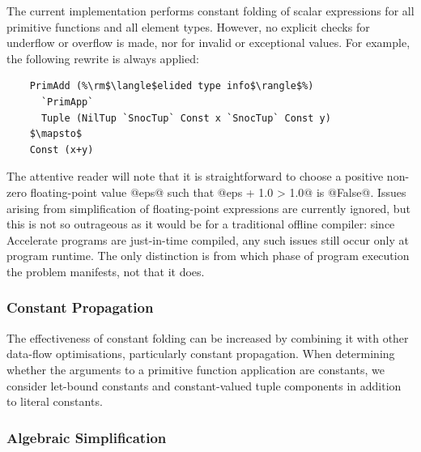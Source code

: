 The current implementation performs constant folding of scalar expressions for
all primitive functions and all element types. However, no explicit checks for
underflow or overflow is made, nor for invalid or exceptional values. For
example, the following rewrite is always applied:
%
%
\begin{lstlisting}[style=Haskell,numbers=none,mathescape]
%\bf$\langle$ constant folding $\rangle$%
    PrimAdd (%\rm$\langle$elided type info$\rangle$%)
      `PrimApp`
      Tuple (NilTup `SnocTup` Const x `SnocTup` Const y)
    $\mapsto$
    Const (x+y)
\end{lstlisting}
%
The attentive reader will note that it is straightforward to choose a positive
non-zero floating-point value @eps@ such that @eps + 1.0 > 1.0@ is
@False@. Issues arising from simplification of floating-point expressions
are currently ignored, but this is not so outrageous as it would be for a
traditional offline compiler: since Accelerate programs are just-in-time
compiled, any such issues still occur only at program runtime. The only
distinction is from which phase of program execution the problem manifests, not
that it does.



\subsubsection{Constant Propagation}

The effectiveness of constant folding can be increased by combining it with
other data-flow optimisations, particularly constant propagation. When
determining whether the arguments to a primitive function application are
constants, we consider let-bound constants and constant-valued tuple components
in addition to literal constants.


\subsubsection{Algebraic Simplification}

